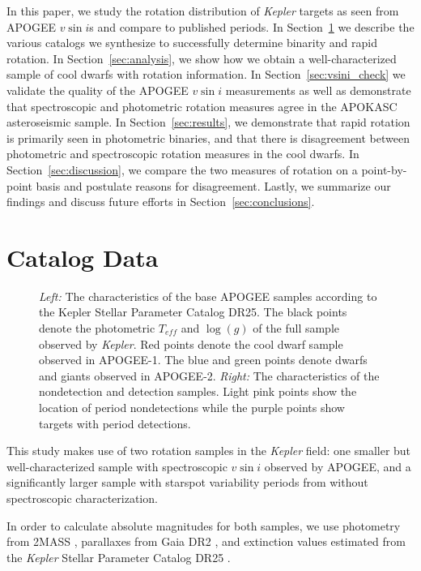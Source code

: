 \documentclass[manuscript]{aastex6}
\newcommand{\vsini}{\ensuremath{v \sin i}}
\newcommand{\Kepler}{\mbox{\textit{Kepler}}}
\newcommand{\Teff}{\ensuremath{T_{eff}}}
\newcommand{\logg}{\ensuremath{\log(g)}}
\begin{document}
In this paper, we study the rotation distribution of \Kepler{} targets as
seen from APOGEE \vsini{}s and compare to published periods. In 
Section~\ref{sec:data} we describe the various catalogs we synthesize to
successfully determine binarity and rapid rotation.
In Section~\ref{sec:analysis}, we show how we obtain a well-characterized
sample of cool dwarfs with rotation information. In
Section~\ref{sec:vsini_check} we validate the quality of the APOGEE \vsini{}
measurements as well as demonstrate that spectroscopic and photometric rotation
measures agree in the 
APOKASC asteroseismic sample. In Section~\ref{sec:results}, we demonstrate that
rapid rotation is primarily seen in photometric binaries, and that there is
disagreement between photometric and spectroscopic rotation measures in the
cool dwarfs. In Section~\ref{sec:discussion}, we compare the two measures of 
rotation on a point-by-point basis and postulate reasons for disagreement. 
Lastly, we summarize our findings and discuss future efforts in 
Section~\ref{sec:conclusions}.

\section{Catalog Data}
\label{sec:data}

\begin{figure}[htb]
    \caption{\emph{Left: } The characteristics of the base APOGEE samples 
        according to the Kepler Stellar Parameter Catalog DR25. The
    black points denote the photometric \Teff{} and \logg{} of the full
    sample observed by \Kepler{}. Red points denote the cool dwarf sample 
    observed in APOGEE-1. The blue and green points denote dwarfs and giants 
 observed in APOGEE-2. \emph{Right: } The characteristics of the
 \citet{McQuillan14} nondetection and detection samples. Light pink points show
 the location of period nondetections while the purple points show targets with 
 period detections.}\label{fig:selection}
\end{figure}

This study makes use of two rotation samples in the \Kepler{} field: one
smaller but well-characterized sample with spectroscopic \vsini{} observed by
APOGEE, and a significantly larger sample with starspot variability periods
from \citet{McQuillan14} without spectroscopic characterization.

In order to calculate absolute magnitudes for both samples, we use photometry
from 2MASS \citep{Skrutskie06}, parallaxes from Gaia DR2 \citep{Gaia18}, and
extinction values estimated from the \Kepler{} Stellar Parameter Catalog DR25
\citep{Huber14,Mathur17}.
\end{document}
